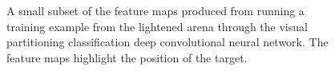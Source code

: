 \begin{figure}[H]
	\begin{scriptsize}
		\sffamily
		\def\svgwidth{\textwidth}
		
	\end{scriptsize}
	\caption[Feature maps]{A small subset of the feature maps produced from running a training example from the lightened arena through the visual partitioning classification deep convolutional neural network. The feature maps highlight the position of the target.}
	\label{fig:featuremaps}
\end{figure}































































